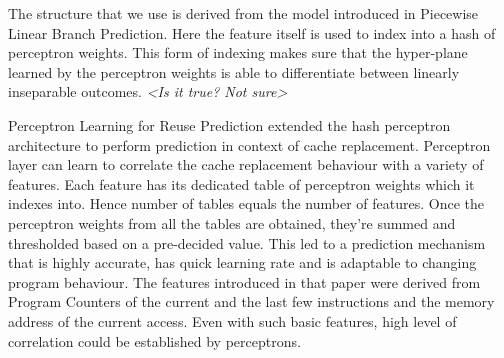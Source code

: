 \documentclass{sig-alternate}
\begin{document}
The structure that we use is derived from the model introduced in Piecewise Linear Branch Prediction\cite{Piece_Linear}. 
Here the feature itself is used to index into a hash of perceptron weights. 
This form of indexing makes sure that the hyper-plane learned by the perceptron weights is able to differentiate between linearly inseparable outcomes. 
\textit{<Is it true? Not sure>}

Perceptron Learning for Reuse Prediction\cite{Perc_Reuse} extended the hash perceptron architecture to perform prediction in context of cache replacement. 
Perceptron layer can learn to correlate the cache replacement behaviour with a variety of features. 
Each feature has its dedicated table of perceptron weights which it indexes into. 
Hence number of tables equals the number of features. 
Once the perceptron weights from all the tables are obtained, they're summed and thresholded based on a pre-decided value. 
This led to a prediction mechanism that is highly accurate, has quick learning rate and is adaptable to changing program behaviour. 
The features introduced in that paper were derived from Program Counters of the current and the last few instructions and the memory address of the current access. 
Even with such basic features, high level of correlation could be established by perceptrons. 
\end{document}
